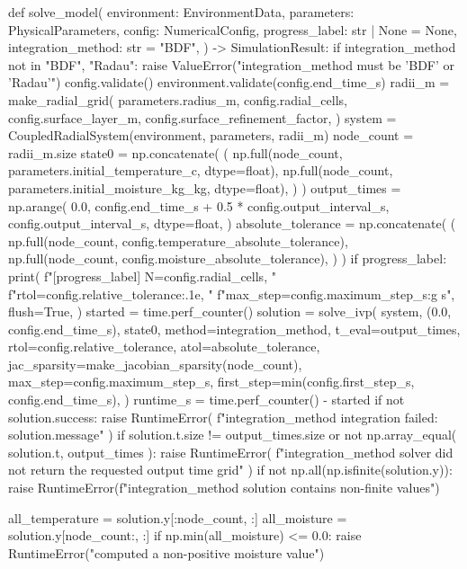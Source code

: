 \documentclass[withoutpreface,bwprint]{cumcmthesis}
\begin{document}
\begin{PythonCode}
def solve_model(
    environment: EnvironmentData,
    parameters: PhysicalParameters,
    config: NumericalConfig,
    progress_label: str | None = None,
    integration_method: str = "BDF",
) -> SimulationResult:
    if integration_method not in {"BDF", "Radau"}:
        raise ValueError("integration_method must be 'BDF' or 'Radau'")
    config.validate()
    environment.validate(config.end_time_s)
    radii_m = make_radial_grid(
        parameters.radius_m,
        config.radial_cells,
        config.surface_layer_m,
        config.surface_refinement_factor,
    )
    system = CoupledRadialSystem(environment, parameters, radii_m)
    node_count = radii_m.size
    state0 = np.concatenate(
        (
            np.full(node_count, parameters.initial_temperature_c, dtype=float),
            np.full(node_count, parameters.initial_moisture_kg_kg, dtype=float),
        )
    )
    output_times = np.arange(
        0.0,
        config.end_time_s + 0.5 * config.output_interval_s,
        config.output_interval_s,
        dtype=float,
    )
    absolute_tolerance = np.concatenate(
        (
            np.full(node_count, config.temperature_absolute_tolerance),
            np.full(node_count, config.moisture_absolute_tolerance),
        )
    )
    if progress_label:
        print(
            f"[{progress_label}] N={config.radial_cells}, "
            f"rtol={config.relative_tolerance:.1e}, "
            f"max_step={config.maximum_step_s:g} s",
            flush=True,
        )
    started = time.perf_counter()
    solution = solve_ivp(
        system,
        (0.0, config.end_time_s),
        state0,
        method=integration_method,
        t_eval=output_times,
        rtol=config.relative_tolerance,
        atol=absolute_tolerance,
        jac_sparsity=make_jacobian_sparsity(node_count),
        max_step=config.maximum_step_s,
        first_step=min(config.first_step_s, config.end_time_s),
    )
    runtime_s = time.perf_counter() - started
    if not solution.success:
        raise RuntimeError(
            f"{integration_method} integration failed: {solution.message}"
        )
    if solution.t.size != output_times.size or not np.array_equal(
        solution.t, output_times
    ):
        raise RuntimeError(
            f"{integration_method} solver did not return the requested output time grid"
        )
    if not np.all(np.isfinite(solution.y)):
        raise RuntimeError(f"{integration_method} solution contains non-finite values")

    all_temperature = solution.y[:node_count, :]
    all_moisture = solution.y[node_count:, :]
    if np.min(all_moisture) <= 0.0:
        raise RuntimeError("computed a non-positive moisture value")


\end{PythonCode}
\end{document}
